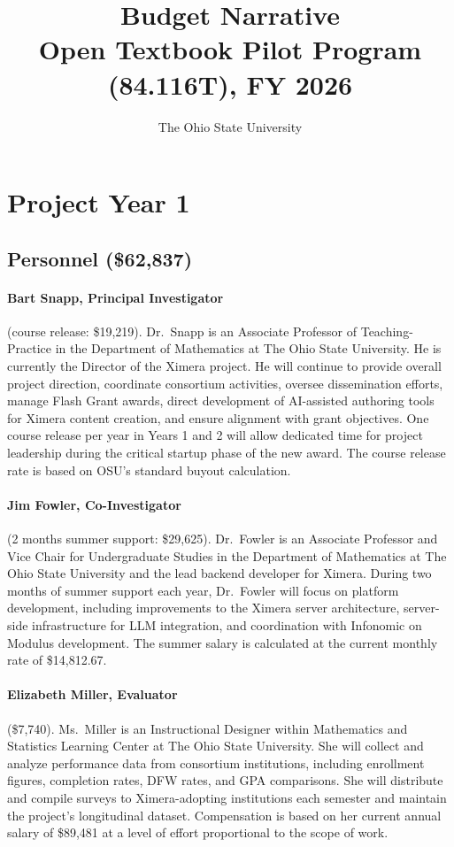 \documentclass[12pt,letterpaper]{article}
\title{\bfseries Budget Narrative\\[0.5ex]
  \large Open Textbook Pilot Program (84.116T), FY 2026}
\author{The Ohio State University}
\date{}
\newcommand{\budgetyear}[1]{\section{Project Year #1}}
\newcommand{\budgetcat}[1]{\subsection*{#1}}
\begin{document}
\singlespacing %

\maketitle
\thispagestyle{empty}
\clearpage

\budgetyear{1}
\budgetcat{Personnel (\$62,837)}
  \paragraph{Bart Snapp, Principal Investigator}  (course release: \$19,219). Dr.\ Snapp is an Associate Professor of Teaching-Practice in the Department of Mathematics at The Ohio State University. He is currently the Director of the Ximera  project. He will continue to provide overall project direction, coordinate consortium activities, oversee dissemination efforts, manage Flash Grant awards, direct development of AI-assisted authoring tools for Ximera content creation, and ensure alignment with grant objectives. One course release per year in Years 1 and 2 will allow dedicated time for project leadership during the critical startup phase of the new award. The course release rate is based on OSU's standard buyout calculation.
  \paragraph{Jim Fowler, Co-Investigator}  (2 months summer support: \$29,625). Dr.\ Fowler is an Associate Professor and Vice Chair for Undergraduate Studies
in the Department of Mathematics at The Ohio State University and the lead backend developer for Ximera. During two months of summer support each year, Dr.\ Fowler will focus on platform development, including improvements to the Ximera server architecture, server-side infrastructure for LLM integration, and coordination with Infonomic on Modulus development. The summer salary is calculated at the current monthly rate of \$14,812.67.
  \paragraph{Elizabeth Miller, Evaluator}  (\$7,740). Ms.\ Miller is an Instructional Designer within Mathematics and Statistics Learning Center at The Ohio State University. She will collect and analyze performance data from consortium institutions, including enrollment figures, completion rates, DFW rates, and GPA comparisons. She will distribute and compile surveys to Ximera-adopting institutions each semester and maintain the project's longitudinal dataset. Compensation is based on her current annual salary of \$89,481 at a level of effort proportional to the scope of work.
\end{document}
